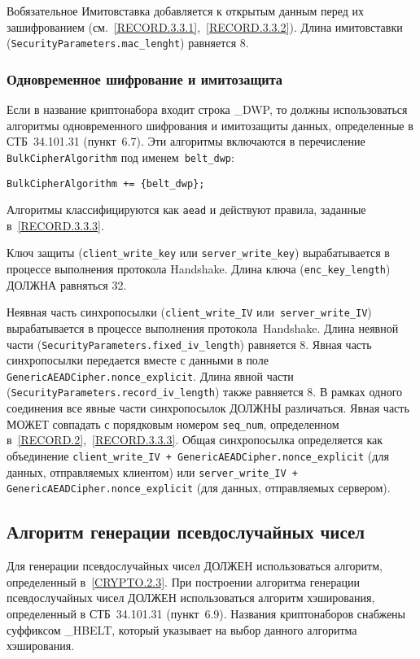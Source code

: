 \begin{appendix}{В}{обязательное}
Имитовставка добавляется к открытым данным перед их зашифрованием
(см.~\ref{RECORD.3.3.1},~\ref{RECORD.3.3.2}). Длина имитовставки
(\lstinline{SecurityParameters.mac_lenght}) равняется 8.

\subsubsection{Одновременное шифрование и имитозащита}\label{BSUITES.2.1.3}

Если в название криптонабора входит строка \_DWP, то должны использоваться 
алгоритмы одновременного шифрования и имитозащиты данных, определенные в 
СТБ~34.101.31 (пункт~6.7). Эти алгоритмы включаются в перечисление 
\lstinline{BulkCipherAlgorithm} под именем~\lstinline{belt_dwp}: 
\begin{lstlisting}
BulkCipherAlgorithm += {belt_dwp};
\end{lstlisting}

Алгоритмы классифицируются как \lstinline{aead} и действуют правила, 
заданные в~\ref{RECORD.3.3.3}. 

Ключ защиты (\lstinline{client_write_key} или 
\lstinline{server_write_key}) вырабатывается в процессе выполнения 
протокола Handshake. Длина ключа (\lstinline{enc_key_length})  
ДОЛЖНА равняться 32. 

Неявная часть синхропосылки (\lstinline{client_write_IV} 
или~\lstinline{server_write_IV}) 
вырабатывается в процессе выполнения протокола~Handshake. Длина неявной  
части (\lstinline{SecurityParameters.fixed_iv_length}) равняется 8. 
Явная часть синхропосылки передается вместе с данными в поле 
\mbox{\lstinline{GenericAEADCipher.nonce_explicit}.} 
%
Длина явной части (\lstinline{SecurityParameters.record_iv_length}) 
также равняется 8. В рамках одного соединения все явные части синхропосылок 
ДОЛЖНЫ различаться. Явная часть МОЖЕТ совпадать с порядковым номером 
\lstinline{seq_num}, определенном в~\ref{RECORD.2},~\ref{RECORD.3.3.3}.  
%
Общая синхропосылка определяется как объединение 
\mbox{\lstinline{client_write_IV + GenericAEADCipher.nonce_explicit}} 
(для данных, отправляемых клиентом) или 
\mbox{\lstinline{server_write_IV + GenericAEADCipher.nonce_explicit}} 
(для данных, отправляемых сервером).  

\subsection{Алгоритм генерации псевдослучайных чисел}\label{BSUITES.2.2}

Для генерации псевдослучайных чисел ДОЛЖЕН использоваться алгоритм, 
определенный в~\ref{CRYPTO.2.3}. При построении алгоритма генерации псевдослучайных 
чисел ДОЛЖЕН использоваться алгоритм хэширования, определенный в СТБ~34.101.31 
(пункт~6.9). Названия криптонаборов снабжены суффиксом \_HBELT, 
который указывает на выбор данного алгоритма хэширования. 


\end{appendix}
